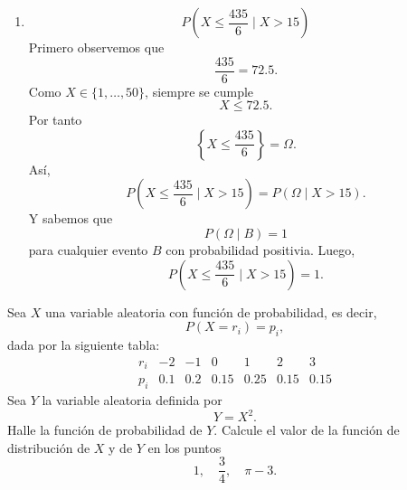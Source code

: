 \documentclass[12pt,a4paper]{article}
\newcommand{\paren}[1]{\left( #1 \right)}
\begin{document}
\begin{solucion}
\begin{enumerate}
\begin{equation*}
                50-11+1=40
            \end{equation*}
            valores. Por tanto
            \begin{equation*}
                P(X\gt20\mid X\gt10)=\frac{\frac{30}{50}}{\frac{40}{50}}=\frac{30}{40}=\frac{3}{4}.
            \end{equation*}
            \begin{equation*}
                P(X\gt20\mid X\gt10)=\frac{3}{4}
            \end{equation*}
            \item[(d)]
            \begin{equation*}
                P\paren{X\leq\frac{435}{6}\mid X\gt15}
            \end{equation*}
            Primero observemos que
            \begin{equation*}
                \frac{435}{6}=72.5.
            \end{equation*}
            Como $X\in\{1,\dots,50\}$, siempre se cumple
            \begin{equation*}
                X\leq72.5.
            \end{equation*}
            Por tanto
            \begin{equation*}
                \left\{X\leq\frac{435}{6}\right\}=\Omega.
            \end{equation*}
            Así,
            \begin{equation*}
                P\paren{X\leq\frac{435}{6}\mid X\gt15}=P(\Omega\mid X\gt15).
            \end{equation*}
            Y sabemos que
            \begin{equation*}
                P(\Omega\mid B)=1
            \end{equation*}
            para cualquier evento $B$ con probabilidad positivia. Luego,
            \begin{equation*}
                P(X\leq\frac{435}{6}\mid X\gt15)=1.
            \end{equation*}
        \end{enumerate}
    \end{solucion}

    \begin{mdframed}[style=mdpinkbox,frametitle={Ejercicio 7}]
        Sea $X$ una variable aleatoria con función de probabilidad, es decir,
        \[
        P(X=r_{i})=p_{i},
        \]
        dada por la siguiente tabla:
        \[
        \begin{array}{c|cccccc}
            r_{i} & -2 & -1 & 0 & 1 & 2 & 3\\
            \hline
            p_{i} & 0.1 & 0.2 & 0.15 & 0.25 & 0.15 & 0.15
        \end{array}
        \]
        Sea $Y$ la variable aleatoria definida por
        \[
        Y=X^{2}.
        \]
        Halle la función de probabilidad de $Y$.
        Calcule el valor de la función de distribución de $X$ y de $Y$ en los puntos
        \[
        1,\quad \frac{3}{4},\quad \pi-3.
        \]
    \end{mdframed}
\end{document}
